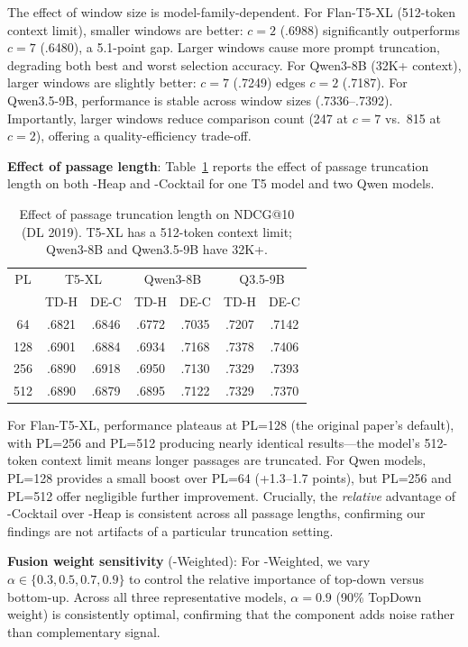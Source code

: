 The effect of window size is model-family-dependent. For Flan-T5-XL (512-token context limit), smaller windows are better: $c=2$ (.6988) significantly outperforms $c=7$ (.6480), a 5.1-point gap. Larger windows cause more prompt truncation, degrading both best and worst selection accuracy. For Qwen3-8B (32K+ context), larger windows are slightly better: $c=7$ (.7249) edges $c=2$ (.7187). For Qwen3.5-9B, performance is stable across window sizes (.7336--.7392). Importantly, larger windows reduce comparison count (247 at $c=7$ vs.\ 815 at $c=2$), offering a quality-efficiency trade-off.

\textbf{Effect of passage length}: Table~\ref{tab:ablation_pl} reports the effect of passage truncation length on both \topdown{}-Heap and \dualend{}-Cocktail for one T5 model and two Qwen models.

\begin{table}[!htbp]
\caption{Effect of passage truncation length on NDCG@10 (DL 2019). T5-XL has a 512-token context limit; Qwen3-8B and Qwen3.5-9B have 32K+.}
\label{tab:ablation_pl}
\small
\begin{tabular}{ccccccc}
\toprule
PL & \multicolumn{2}{c}{T5-XL} & \multicolumn{2}{c}{Qwen3-8B} & \multicolumn{2}{c}{Q3.5-9B} \\
 & TD-H & DE-C & TD-H & DE-C & TD-H & DE-C \\
\midrule
64 & .6821 & .6846 & .6772 & .7035 & .7207 & .7142 \\
128 & .6901 & .6884 & .6934 & .7168 & .7378 & .7406 \\
256 & .6890 & .6918 & .6950 & .7130 & .7329 & .7393 \\
512 & .6890 & .6879 & .6895 & .7122 & .7329 & .7370 \\
\bottomrule
\end{tabular}
\end{table}

For Flan-T5-XL, performance plateaus at PL=128 (the original paper's default), with PL=256 and PL=512 producing nearly identical results---the model's 512-token context limit means longer passages are truncated. For Qwen models, PL=128 provides a small boost over PL=64 (+1.3--1.7 points), but PL=256 and PL=512 offer negligible further improvement. Crucially, the \emph{relative} advantage of \dualend{}-Cocktail over \topdown{}-Heap is consistent across all passage lengths, confirming our findings are not artifacts of a particular truncation setting.

\textbf{Fusion weight sensitivity} (\bidir{}-Weighted): For \bidir{}-Weighted, we vary $\alpha \in \{0.3, 0.5, 0.7, 0.9\}$ to control the relative importance of top-down versus bottom-up. Across all three representative models, $\alpha=0.9$ (90\% TopDown weight) is consistently optimal, confirming that the \bottomup{} component adds noise rather than complementary signal.

